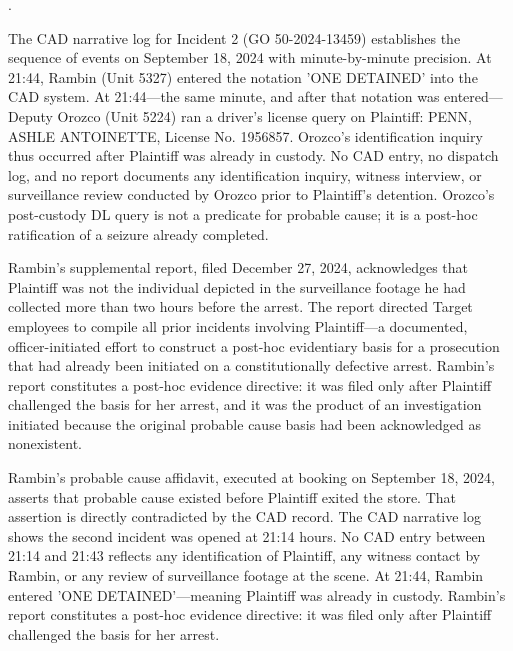 \documentclass[12pt,letterpaper]{article}
\newcounter{complaintpara}
\newenvironment{paras}{%
	\begin{list}{\arabic{complaintpara}.}{%
			\setlength{\leftmargin}{0.5in}%
			\setlength{\labelwidth}{0.4in}%
			\setlength{\labelsep}{0.1in}%
			\setlength{\itemsep}{0pt}%
			\setlength{\parsep}{0pt}%
			\setlength{\topsep}{6pt}%
		}%
	}{%
	\end{list}%
}
\begin{document}
\begin{paras}
		\item\label{fact:cad-sequence} The CAD narrative log for Incident 2 (GO 50-2024-13459) establishes the sequence of events on September 18, 2024 with minute-by-minute precision. At 21:44, Rambin (Unit 5327) entered the notation 'ONE DETAINED' into the CAD system. At 21:44---the same minute, and after that notation was entered---Deputy Orozco (Unit 5224) ran a driver's license query on Plaintiff: PENN, ASHLE ANTOINETTE, License No. 1956857. Orozco's identification inquiry thus occurred after Plaintiff was already in custody. No CAD entry, no dispatch log, and no report documents any identification inquiry, witness interview, or surveillance review conducted by Orozco prior to Plaintiff's detention. Orozco's post-custody DL query is not a predicate for probable cause; it is a post-hoc ratification of a seizure already completed.
		
		\item\label{fact:supp} Rambin's supplemental report, filed
		December 27, 2024, acknowledges that Plaintiff was not the
		individual depicted in the surveillance footage he had
		collected more than two hours before the arrest. The report directed Target employees to compile all prior
		incidents involving Plaintiff---a documented, officer-initiated
		effort to construct a post-hoc evidentiary basis for a
		prosecution that had already been initiated on a
		constitutionally defective arrest. Rambin's report constitutes
		a post-hoc evidence directive: it was filed only after Plaintiff challenged the basis for her arrest, and it was the product of an investigation initiated because the original probable cause basis had been acknowledged as nonexistent.
		\item\label{fact:pc-affidavit-cad} Rambin's probable cause affidavit, executed at booking on September 18, 2024, asserts that probable cause existed before Plaintiff exited the store. That assertion is directly
		contradicted by the CAD record. The CAD narrative log shows
		the second incident was opened at 21:14 hours. No CAD entry
		between 21:14 and 21:43 reflects any identification of
		Plaintiff, any witness contact by Rambin, or any review of
		surveillance footage at the scene. At 21:44, Rambin entered 'ONE DETAINED'---meaning Plaintiff was already in custody. Rambin's
		report constitutes a post-hoc evidence directive: it was filed
		only after Plaintiff challenged the basis for her arrest.
		

\end{paras}
\end{document}
